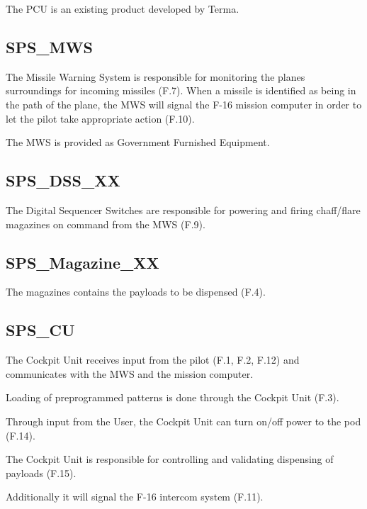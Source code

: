 \documentclass[Main]{subfiles}
\begin{document}
The PCU is an existing product developed by Terma.

\subsection{SPS\_MWS}
The Missile Warning System is responsible for monitoring the planes surroundings for incoming missiles (F.7).
When a missile is identified as being in the path of the plane, the MWS will signal the F-16 mission computer in order to let the pilot take appropriate action (F.10).

The MWS is provided as Government Furnished Equipment.

\subsection{SPS\_DSS\_XX}
The Digital Sequencer Switches are responsible for powering and firing chaff/flare magazines on command from the MWS (F.9).

\subsection{SPS\_Magazine\_XX}
The magazines contains the payloads to be dispensed (F.4).

\subsection{SPS\_CU}
The Cockpit Unit receives input from the pilot (F.1, F.2, F.12) and communicates with the MWS and the mission computer.

Loading of preprogrammed patterns is done through the Cockpit Unit (F.3).

Through input from the User, the Cockpit Unit can turn on/off power to the pod (F.14).

The Cockpit Unit is responsible for controlling and validating dispensing of payloads (F.15).

Additionally it will signal the F-16 intercom system (F.11).
\end{document}
